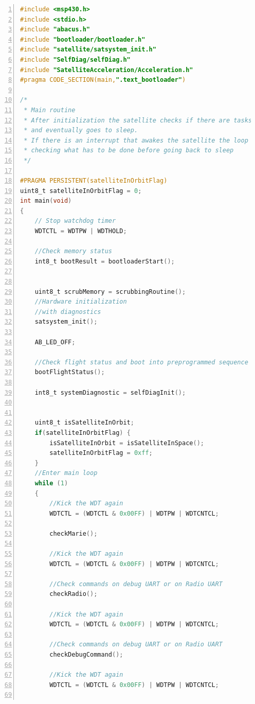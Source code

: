 \documentclass[LaM,binding=0.6cm,oneside]{../sapthesis}
\begin{document}
\begin{lstlisting}[language=C,
                   basicstyle=\scriptsize,
                   numbers=left,
                   stepnumber=0,
                   numbersep=4pt,
                   tabsize=2,
                   showspaces=false,
                   showstringspaces=false]
#include <msp430.h>
#include <stdio.h>
#include "abacus.h"
#include "bootloader/bootloader.h"
#include "satellite/satsystem_init.h"
#include "SelfDiag/selfDiag.h"
#include "SatelliteAcceleration/Acceleration.h"
#pragma CODE_SECTION(main,".text_bootloader")

/*
 * Main routine
 * After initialization the satellite checks if there are tasks to do 
 * and eventually goes to sleep.
 * If there is an interrupt that awakes the satellite the loop is executed
 * checking what has to be done before going back to sleep
 */
 
#PRAGMA PERSISTENT(satelliteInOrbitFlag)
uint8_t satelliteInOrbitFlag = 0;
int main(void)
{
    // Stop watchdog timer
    WDTCTL = WDTPW | WDTHOLD;

    //Check memory status
    int8_t bootResult = bootloaderStart();


    uint8_t scrubMemory = scrubbingRoutine();
    //Hardware initialization
    //with diagnostics
    satsystem_init();

    AB_LED_OFF;

    //Check flight status and boot into preprogrammed sequence
    bootFlightStatus();

    int8_t systemDiagnostic = selfDiagInit();


    uint8_t isSatelliteInOrbit;
    if(satelliteInOrbitFlag) {
        isSatelliteInOrbit = isSatelliteInSpace();
        satelliteInOrbitFlag = 0xff;
    }
    //Enter main loop
    while (1)
    {
        //Kick the WDT again
        WDTCTL = (WDTCTL & 0x00FF) | WDTPW | WDTCNTCL;

        checkMarie();

        //Kick the WDT again
        WDTCTL = (WDTCTL & 0x00FF) | WDTPW | WDTCNTCL;

        //Check commands on debug UART or on Radio UART
        checkRadio();

        //Kick the WDT again
        WDTCTL = (WDTCTL & 0x00FF) | WDTPW | WDTCNTCL;

        //Check commands on debug UART or on Radio UART
        checkDebugCommand();

        //Kick the WDT again
        WDTCTL = (WDTCTL & 0x00FF) | WDTPW | WDTCNTCL;


\end{lstlisting}
\end{document}
